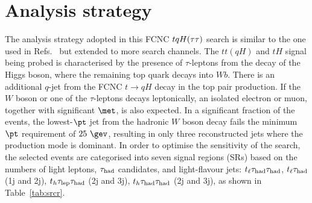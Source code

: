 \section{Analysis strategy}
\label{sec:strategy_Htautau}

The analysis strategy adopted in this FCNC $tqH(\tau\tau)$ search is similar to the one used in Refs.~\cite{fcnc36,Chen:2015nta} but extended to more search channels.
The $tt(qH)$ and $tH$ signal being probed is characterised by the presence of $\tau$-leptons from the decay of 
the Higgs boson, where the remaining top quark decays into $Wb$. There is an additional $q$-jet from the FCNC $t\to qH$ decay in the top pair production. 
If the $W$ boson or one of the $\tau$-leptons decays leptonically, an isolated electron or muon, together with significant $\met$, is also expected.
In a significant fraction of the events, the lowest-$\pt$ jet from the hadronic $W$ boson decay fails the minimum $\pt$ requirement of $25~\gev$,
resulting in only three reconstructed jets where the production mode is dominant. 
In order to optimise the sensitivity of the search, the selected events are categorised into seven signal regions (SRs) based on the  numbers of light leptons,
$\tau_{\mathrm{had}}$ candidates, and light-flavour jets:
$t_{\ell}\tau_{\mathrm{had}} \tau_{\mathrm{had}}$, $t_{\ell}\tau_{\mathrm{had}}$ (1j and 2j), $t_h\tau_{\mathrm{lep}} \tau_{\mathrm{had}}$ (2j and 3j), $t_h\tau_{\mathrm{had}} \tau_{\mathrm{had}}$ (2j and 3j), as shown in Table~\ref{tab:srcr}. 

